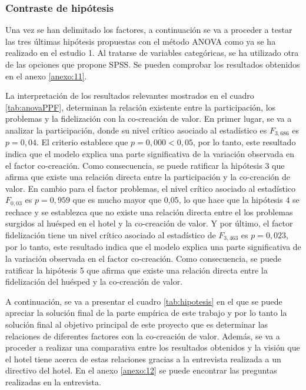 

\subsubsection{Contraste de hipótesis}

Una vez se han delimitado los factores, a continuación se va a proceder a testar las tres últimas hipótesis propuestas con el método ANOVA como ya se ha realizado en el estudio 1. Al tratarse de variables categóricas, se ha utilizado otra de las opciones que propone SPSS. Se pueden comprobar los resultados obtenidos en el anexo \ref{anexo:11}.

La interpretación de los resultados relevantes mostrados en el cuadro \ref{tab:anovaPPF}, determinan la relación existente entre la participación, los problemas y la fidelización con la co-creación de valor. En primer lugar, se va a analizar la participación, donde su nivel crítico asociado al estadístico es $ F_{3,686} $ es $ p = 0,04 $. El criterio establece que $ p = 0,000 < 0,05 $, por lo tanto, este resultado indica que el modelo explica una parte significativa de la variación observada en el factor co-creación. Como consecuencia, se puede ratificar la hipótesis 3 que afirma que existe una relación directa entre la participación y la co-creación de valor. En cambio para el factor problemas, el nivel crítico asociado al estadístico $ F_{0,03} $ es $ p = 0,959 $ que es mucho mayor que 0,05, lo que hace que la hipótesis 4 se rechace y se establezca que no existe una relación directa entre el los problemas surgidos al huésped en el hotel y la co-creación de valor. Y por último, el factor fidelización tiene un nivel crítico asociado al estadístico de $ F_{3,463} $ es $ p = 0,023 $, por lo tanto, este resultado indica que el modelo explica una parte significativa de la variación observada en el factor co-creación. Como consecuencia, se puede ratificar la hipótesis 5 que afirma que existe una relación directa entre la fidelización del huésped y la co-creación de valor.



A continuación, se va a presentar el cuadro \ref{tab:hipotesis} en el que se puede apreciar la solución final de la parte empírica de este trabajo y por lo tanto la solución final al objetivo principal de este proyecto que es determinar las relaciones de diferentes factores con la co-creación de valor. Además, se va a proceder a realizar una comparativa entre los resultados obtenidos y la visión que el hotel tiene acerca de estas relaciones gracias a la entrevista realizada a un directivo del hotel. En el anexo \ref{anexo:12} se puede encontrar las preguntas realizadas en la entrevista.

